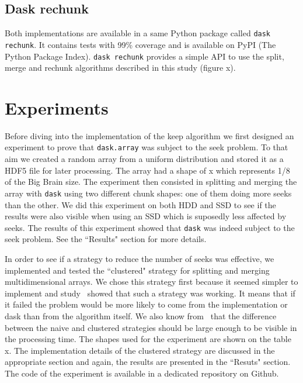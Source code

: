 \documentclass[conference]{IEEEtran}
\begin{document}
\subsection{Dask rechunk}

Both implementations are available in a same Python package called \texttt{dask rechunk}. It
contains tests with 99\% coverage and is available on PyPI (The Python Package
Index). \texttt{dask rechunk} provides a simple API to use the split, merge and rechunk
algorithms described in this study (figure x).

\section{Experiments}
Before diving into the implementation of the keep algorithm we first designed
an experiment to prove that \texttt{dask.array} was subject to the seek problem. To that
aim we created a random array from a uniform distribution and stored it as a
HDF5 file for later processing. The array had a shape of x which represents 1/8
of the Big Brain size. The experiment then consisted in splitting and merging
the array with \texttt{dask} using two different chunk shapes: one of them doing more
seeks than the other. We did this experiment on both HDD and SSD to see if the
results were also visible when using an SSD which is suposedly less affected by
seeks. The results of this experiment showed that \texttt{dask} was indeed subject to the
seek problem. See the ``Results" section for more details.

In order to see if a strategy to reduce the number of seeks was effective, we
implemented and tested the ``clustered" strategy for splitting and merging
multidimensional arrays. We chose this strategy first because it seemed simpler
to implement and study~\cite{seqalgorithms} showed that such a strategy was
working. It means that if it failed the problem would be more likely to come
from the implementation or dask than from the algorithm itself. We also know
from~\cite{seqalgorithms} that the difference between the naive and clustered
strategies should be large enough to be visible in the processing time. The
shapes used for the experiment are shown on the table x. The implementation
details of the clustered strategy are discussed in the appropriate section and
again, the results are presented in the ``Resuts" section. The code of the
experiment is available in a dedicated repository on Github.
\end{document}
